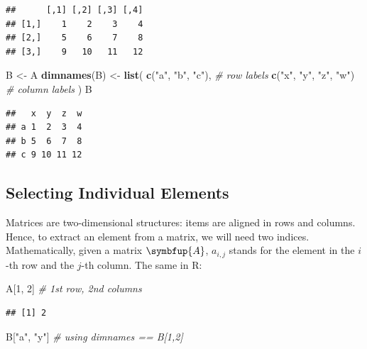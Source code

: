 \documentclass[10pt,b5paper,krantz1]{krantz}
\newenvironment{Shaded}{\begin{snugshade}}{\end{snugshade}}
\newcommand{\CommentTok}[1]{\textcolor[rgb]{0.37,0.37,0.37}{\textit{#1}}}
\newcommand{\DecValTok}[1]{\textcolor[rgb]{0.06,0.06,0.06}{#1}}
\newcommand{\KeywordTok}[1]{\textcolor[rgb]{0.27,0.27,0.27}{\textbf{#1}}}
\newcommand{\NormalTok}[1]{#1}
\newcommand{\StringTok}[1]{\textcolor[rgb]{0.5,0.5,0.5}{#1}}
\renewcommand{\mathbf}[1]{\symbfup{#1}}
\begin{document}
\begin{verbatim}
##      [,1] [,2] [,3] [,4]
## [1,]    1    2    3    4
## [2,]    5    6    7    8
## [3,]    9   10   11   12
\end{verbatim}

\begin{Shaded}
\begin{Highlighting}[]
\NormalTok{B <-}\StringTok{ }\NormalTok{A}
\KeywordTok{dimnames}\NormalTok{(B) <-}\StringTok{ }\KeywordTok{list}\NormalTok{(}
    \KeywordTok{c}\NormalTok{(}\StringTok{"a"}\NormalTok{, }\StringTok{"b"}\NormalTok{, }\StringTok{"c"}\NormalTok{),     }\CommentTok{# row labels}
    \KeywordTok{c}\NormalTok{(}\StringTok{"x"}\NormalTok{, }\StringTok{"y"}\NormalTok{, }\StringTok{"z"}\NormalTok{, }\StringTok{"w"}\NormalTok{) }\CommentTok{# column labels}
\NormalTok{)}
\NormalTok{B}
\end{Highlighting}
\end{Shaded}

\begin{verbatim}
##   x  y  z  w
## a 1  2  3  4
## b 5  6  7  8
## c 9 10 11 12
\end{verbatim}

\hypertarget{selecting-individual-elements}{%
\subsection{Selecting Individual Elements}\label{selecting-individual-elements}}

Matrices are two-dimensional structures: items are aligned in rows and columns.
Hence, to extract an element from a matrix, we will need two indices.
Mathematically, given a matrix \(\mathbf{A}\), \(a_{i,j}\) stands for the element
in the \(i\)-th row and the \(j\)-th column. The same in R:

\begin{Shaded}
\begin{Highlighting}[]
\NormalTok{A[}\DecValTok{1}\NormalTok{, }\DecValTok{2}\NormalTok{] }\CommentTok{# 1st row, 2nd columns}
\end{Highlighting}
\end{Shaded}

\begin{verbatim}
## [1] 2
\end{verbatim}

\begin{Shaded}
\begin{Highlighting}[]
\NormalTok{B[}\StringTok{"a"}\NormalTok{, }\StringTok{"y"}\NormalTok{] }\CommentTok{# using dimnames == B[1,2]}
\end{Highlighting}
\end{Shaded}
\end{document}
